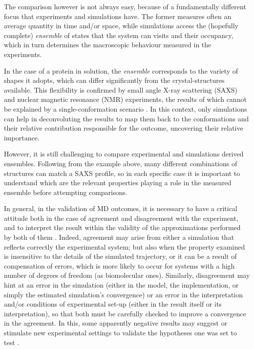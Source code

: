 The comparison however is not always easy, because of a fundamentally different focus that experiments and simulations have. The former measures often an average quantity in time and/or space, while simulations access the (hopefully complete) \emph{ensemble} of states that the system can visits and their occupancy, which in turn determines the macroscopic behaviour measured in the experiments.

In the case of a protein in solution, the \emph{ensemble} corresponds to the variety of shapes it adopts, which can differ significantly from the crystal-structures available. This flexibility is confirmed by small angle X-ray scattering (SAXS) and nuclear magnetic resonance (NMR) experiments, the results of which cannot be explained by a single-conformation scenario \cite{Bonomi2017,Kikhney2015,Kleckner2011}. In this context, only simulations can help in deconvoluting the results to map them back to the conformations and their relative contribution responsible for the outcome, uncovering their relative importance.

However, it is still challenging to compare experimental and simulations derived ensembles. Following from the example above, many different combinations of structures can match a SAXS profile, so in each specific case it is important to understand which are the relevant properties playing a role in the measured ensemble before attempting comparisons.

In general, in the validation of MD outcomes, it is necessary to have a critical attitude both in the case of agreement and disagreement with the experiment, and to interpret the result within the validity of the approximations performed by both of them \cite{VanGunsteren2008}.
%
Indeed, agreement may arise from either a simulation that reflects correctly the experimental system; but also when the property examined is insensitive to the details of the simulated trajectory, or it can be a result of compensation of errors, which is more likely to occur for systems with a high number of degrees of freedom (as biomolecular ones).
%
Similarly, disagreement may hint at an error in the simulation (either in the model, the implementation, or simply the estimated simulation's convergence) or an error in the interpretation and/or conditions of experimental set-up (either in the result itself or its interpretation), so that both must be carefully checked to improve a convergence in the agreement.
%
In this, some apparently negative results may suggest or stimulate new experimental settings to validate the hypotheses one was set to test \cite{Goncalves2013,Meissner2014}.

